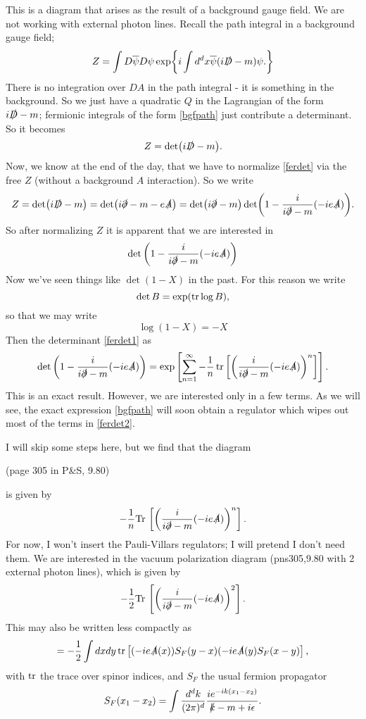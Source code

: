 \documentclass[main.tex]{subfiles}
\begin{document}
This is a diagram that arises as the result of a background gauge field. We are not working with external photon lines. Recall the path integral in a background gauge field;
\begin{equation} \label{bgfpath}
Z = \int D \overline{\psi} D \psi \exp{
i \int d^d x \overline{\psi} (i\slashed{D} - m) \psi.}
\end{equation}
There is no integration over $DA$ in the path integral - it is something in the background. So we just have a quadratic $Q$ in the Lagrangian of the form $i\slashed{D} - m$; fermionic integrals of the form \ref{bgfpath} just contribute a determinant. So it becomes
\begin{equation} \label{ferdet}
Z = \det (i \slashed{D} - m).
\end{equation}
Now, we know at the end of the day, that we have to normalize \ref{ferdet} via the free $Z$ (without a background $A$ interaction). So we write
\[
Z = \det (i \slashed{D} - m) = \det (i\slashed{\partial} - m - e \slashed{A}) = \det(i \slashed{\partial} - m) \det (1 - \frac{i}{i \slashed{\partial} - m} (-ie\slashed{A})).
\]
So after normalizing $Z$ it is apparent that we are interested in
\begin{equation} \label{ferdet1}
\det \left(
1 - \frac{i}{i \slashed{\partial} - m} (-ie\slashed{A})
\right)
\end{equation}
Now we've seen things like $\det (1 - X)$ in the past. For this reason we write
\[
\det B = \exp (\tr \log B),
\]
so that we may write
\[
\log( 1 - X )= -X
\]
Then the determinant \ref{ferdet1} as
\begin{equation} \label{ferdet2}
\det \left(
1 - \frac{i}{i \slashed{\partial} - m} (-ie\slashed{A}) \right) = 
\exp  \left[
\sum_{n=1}^\infty -\frac{1}{n} \tr \left[
\left(
\frac{i}{i\slashed{\partial} - m} (-ie\slashed{A})
\right)^n
\right]
\right].
\end{equation}
This is an exact result. However, we are interested only in a few terms. As we will see, the exact expression \ref{bgfpath} will soon obtain a regulator which wipes out most of the terms in \ref{ferdet2}. 

I will skip some steps here, but we find that the diagram

(page 305 in P{\&}S, 9.80)

is given by
\[
-\frac{1}{n} \text{Tr} \, \left[
\left(
\frac{i}{i\slashed{\partial} - m} (-ie\slashed{A})
\right)^n
\right].
\]
For now, I won't insert the Pauli-Villars regulators; I will pretend I don't need them. We are interested in the vacuum polarization diagram (pns305,9.80 with 2 external photon lines), which is given by
\begin{equation}
-\frac{1}{2} \text{Tr} \, \left[
\left(
\frac{i}{i\slashed{\partial} - m} (-ie\slashed{A})
\right)^2
\right].
\end{equation}
This may also be written less compactly as 
\[
= -\frac{1}{2} \int dx dy \tr \left[ (-ie\slashed{A} (x) ) S_F (y -x) (-ie\slashed{A} (y) S_F (x - y) \right],
\]
with $\tr$ the trace over spinor indices, and $S_F$ the usual fermion propagator
\[
S_F (x_1 - x_2) = \int \frac{d^d k}{(2\pi)^d} \frac{i e^{-ik (x_1 - x_2)}}{\slashed{k} - m + i\epsilon}.
\]
\end{document}
